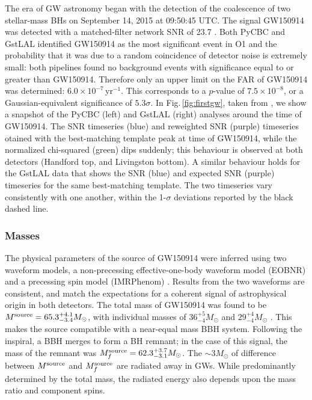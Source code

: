 \documentclass[binding=0.6cm, LaM]{sapthesis}
\begin{document}
	The era of GW astronomy began with the detection of the coalescence of two stellar-mass BHs
	on September 14, 2015 at 09:50:45 UTC.  The signal GW150914 was detected with a matched-filter network SNR of 23.7 \cite{21}. 
	Both PyCBC and GstLAL identified GW150914 as the most significant event in O1 and the probability that 
	it was due to a random coincidence of detector noise is extremely small: 
	both pipelines found no background events with significance 
	equal to or greater than GW150914.  Therefore only an upper limit on the FAR of GW150914 was determined: $6.0 \times 10^{-7}\,$yr$^{-1}$. 
	This corresponds to a $p$-value of $7.5\times10^{-8}$, or a Gaussian-equivalent significance of $5.3\sigma$.  In Fig.\,\ref{fig:firstgw}, taken from \cite{21}, we show a snapshot of the PyCBC (left) and GstLAL (right) analyses around the time of GW150914.  The SNR timeseries (blue) and reweighted SNR (purple) timeseries otained with the best-matching template peak at time of GW150914, while the normalized chi-squared (green) dips suddenly; this behaviour is observed at both detectors (Handford top, and Livingston bottom).  A similar behaviour holds for the GstLAL data that shows the SNR (blue) and expected SNR (purple) timeseries for the same best-matching template.  The two timeseries vary consistently with one another, within the 1-$\sigma$ deviations reported by the black dashed line.

	\subsubsection{Masses}
	The physical parameters of the source of GW150914 were inferred using two waveform models, a non-precessing effective-one-body waveform model (EOBNR) \cite{103, 104} 
	and a precessing spin model (IMRPhenom) \cite{105-107}. 
	Results from the two waveforms are consistent, and match the expectations for a coherent signal of astrophysical origin in both detectors. 
	The total mass of GW150914 was found to be $M^{\rm source} = 65.3^{+4.1}_{-3.4}M_\odot$, with individual masses of $36^{+5}_{-4}M_\odot$ and $29^{+4}_{-4}M_\odot$ \cite{21,41,51}.  This makes the source compatible with a near-equal mass BBH system.
	Following the inspiral, a BBH merges to form a BH remnant; in the case of this signal, the mass of the remnant was $M^{\rm source}_f = 62.3^{+3.7}_{-3.1}M_\odot$.
	The $\sim 3M_\odot$ of difference between $M^{\rm source}$ and $M^{\rm source}_f$ are radiated away in GWs.  While predominantly determined by the total mass, the radiated energy also depends upon the mass ratio and component spins.
\end{document}
